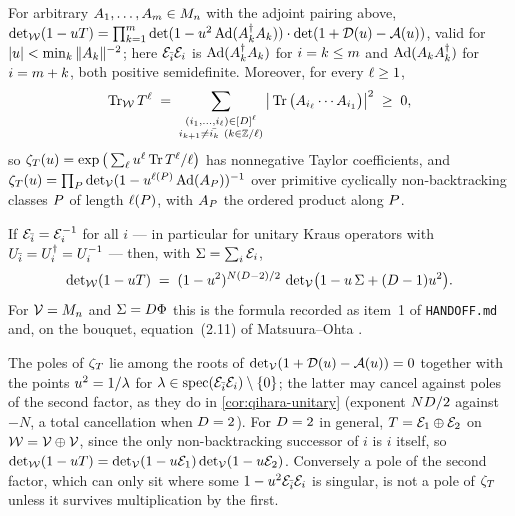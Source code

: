 \begin{corollary}
\label{cor:qihara-kraus}
For arbitrary $A_{1},\dots,A_{m}\in M_n$ with the adjoint pairing above,
$\det\nolimits_{\mathcal W}(1-uT) = \prod_{k=1}^{m}\det(1-u^2\operatorname{Ad}(A_{k}^\dagger A_{k}))\cdot
\det(1+\mathcal D(u)-\mathcal A(u))$, valid for $|u| < \min_k\|A_{k}\|^{-2}$; here $\mathcal E_{\bar{i}}\mathcal E_{i}$ is
$\operatorname{Ad}(A_{k}^\dagger A_{k})$ for $i = k\le m$ and $\operatorname{Ad}(A_{k}A_{k}^\dagger)$ for $i = m+k$, both positive
semidefinite. Moreover, for every $\ell\ge1$,
\[
  \operatorname{Tr}\nolimits_{\mathcal W}T^{\ell} \;=\;
  \sum_{\substack{(i_1,\dots,i_{\ell})\in[D]^{\ell}\\ i_{k+1}\ne\bar{i_k}\ (k\in\mathbb Z/\ell)}}
  \big|\operatorname{Tr}\big(A_{i_{\ell}}\cdots A_{i_1}\big)\big|^2 \;\ge\;0,
\]
so $\zeta_{T}(u) = \exp\big(\sum_{\ell}u^{\ell}\operatorname{Tr}T^{\ell}/\ell\big)$ has nonnegative Taylor coefficients, and
$\zeta_{T}(u) = \prod_{P}\det\nolimits_{\mathcal V}(1-u^{\ell(P)}\operatorname{Ad}(A_{P}))^{-1}$ over primitive
cyclically non-backtracking classes $P$ of length $\ell(P)$, with $A_{P}$ the ordered product
along $P$.
\end{corollary}

\begin{corollary}
\label{cor:qihara-unitary}
If $\mathcal E_{\bar{i}} = \mathcal E_{i}^{-1}$ for all $i$ --- in particular for unitary Kraus operators with
$U_{\bar{i}} = U_{i}^\dagger = U_{i}^{-1}$ --- then, with $\Sigma = \sum_i\mathcal E_{i}$,
\[
  \det\nolimits_{\mathcal W}(1-uT) \;=\;
  (1-u^2)^{N(D-2)/2}\,\det\nolimits_{\mathcal V}\!\big(1-u\,\Sigma+(D-1)u^2\big).
\]
For $\mathcal V = M_n$ and $\Sigma = D\Phi$ this is the formula recorded as item~1 of \texttt{HANDOFF.md} and, on the
bouquet, equation~(2.11) of Matsuura--Ohta \cite{matsuura2022km}.
\end{corollary}

\begin{corollary}
\label{cor:qihara-poles}
The poles of $\zeta_{T}$ lie among the roots of $\det\nolimits_{\mathcal V}(1+\mathcal D(u)-\mathcal A(u)) = 0$ together with the points
$u^2 = 1/\lambda$ for $\lambda\in\operatorname{spec}(\mathcal E_{\bar{i}}\mathcal E_{i})\setminus\{0\}$; the latter may cancel
against poles of the second factor, as they do in \cref{cor:qihara-unitary} (exponent $ND/2$ against $-N$, a total
cancellation when $D = 2$). For $D = 2$ in general, $T = \mathcal E_{1}\oplus\mathcal E_{2}$ on $\mathcal W = \mathcal V\oplus\mathcal V$,
since the only non-backtracking successor of $i$ is $i$ itself, so $\det\nolimits_{\mathcal W}(1-uT) =
\det\nolimits_{\mathcal V}(1-u\mathcal E_{1})\det\nolimits_{\mathcal V}(1-u\mathcal E_{2})$. Conversely a pole of the second factor, which
can only sit where some $1-u^2\mathcal E_{\bar{i}}\mathcal E_{i}$ is singular, is not a pole of $\zeta_{T}$ unless it survives
multiplication by the first.
\end{corollary}

